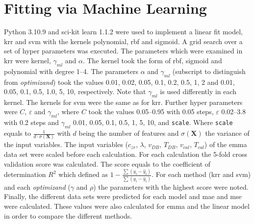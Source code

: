 \section{Fitting via Machine Learning}
Python 3.10.9 and sci-kit learn 1.1.2\cite{pedregosa2011scikit} were used to implement a linear fit model, \gls{krr} and \gls{svm} with the kernels polynomial, \gls{rbf} and sigmoid. 
A grid search over a set of hyper parameters was executed. 
The parameters which were examined in \gls{krr} were kernel, $\gamma_{ml}$ and $\alpha$.
The kernel took the form of \gls{rbf}, sigmoid and polynomial with degree 1--4.
The parameters $\alpha$ and $\gamma_{ml}$ (subscript to distinguish from \textit{optimizand}) took the values 0.01, 0.02, 0.05, 0.1, 0.2, 0.5, 1, 2
and 0.01, 0.05, 0.1, 0.5, 1.0, 5, 10, respectively.
Note that $\gamma_{ml}$ is used differently in each kernel. 
The kernels for \gls{svm} were the same as for \gls{krr}. 
Further hyper parameters were $C$, $\varepsilon$ and $\gamma_{ml}$, 
where $C$ took the values 0.05--0.95 with 0.05 steps, $\varepsilon$ 0.02--3.8 with 0.2 steps 
and $\gamma_{ml}$ 0.01, 0.05, 0.1, 0.5, 1, 5, 10, and \texttt{scale}. 
Where \texttt{scale} equals to $\frac{1}{d \cdot \sigma(\mathbf{X})}$ with $d$ being the number of features 
and $\sigma(\mathbf{X})$ the variance of the input variables. 
The input variables ($c_{zr}$, $\lambda$, $v_{DB}$, $T_{DB}$, $v_{cal}$, $T_{cal}$) 
of the \gls{emma} data set were scaled before each calculation.
For each calculation the 5-fold cross validation score was calculated. 
The score equals to the coefficient of determination $R^2$ which defined as 
$1-\frac{\sum (y_i - \hat{y}_i)}{\sum (y_i - \bar{y}_i)}$.
For each method (\gls{krr} and \gls{svm}) and each \textit{optimizand} ($\gamma$ and $\rho$) 
the parameters with the highest score were noted.
% 
Finally, the different data sets were predicted for each model and \gls{mae} and \gls{mse} were calculated.
These values were also calculated for \gls{emma} and the linear model in order to compare the different methods. 
